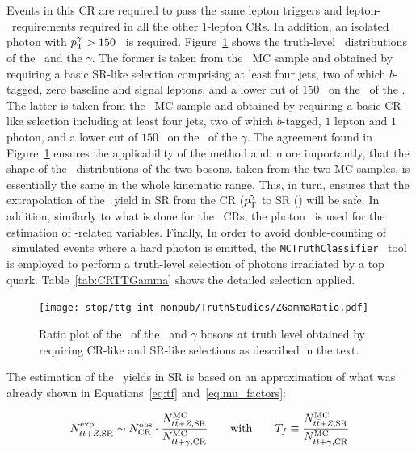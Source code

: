 		Events in this \ac{CR} are required to pass the same lepton triggers and lepton-\pt\ requirements required in all the other $1$-lepton \acp{CR}. In addition, an isolated photon with $p_{\mathrm{T}}^{\gamma} > 150$ \GeV\ is required. Figure~\ref{fig:ZGammaratio} shows the truth-level \pt\ distributions of the \Zboson\ and the $\gamma$. The former is taken from the \ttZ\ \ac{MC} sample and obtained by requiring a basic \ac{SR}-like selection comprising at least four jets, two of which $b$-tagged, zero baseline and signal leptons, and a lower cut of $150$ \GeV\ on the \pt\ of the \Zboson. The latter is taken from the \ttgamma\ \ac{MC} sample and obtained by requiring a basic \ac{CR}-like selection including at least four jets, two of which $b$-tagged, $1$ lepton and $1$ photon, and a lower cut of $150$ \GeV\ on the \pt\ of the $\gamma$. The agreement found in Figure~\ref{fig:ZGammaratio} ensures the applicability of the method and, more importantly, that the shape of the \pt\ distributions of the two bosons. taken from the two \ac{MC} samples, is essentially the same in the whole kinematic range. This, in turn, ensures that the extrapolation of the \ttZ\ yield in \ac{SR} from the CR ($p_{\mathrm{T}}^{\gamma}$ to SR (\met) will be safe. In addition, similarly to what is done for the \Zboson\ \acp{CR}, the photon \pt\ is used for the estimation of \met-related variables. Finally, In order to avoid double-counting of \ttbar\ simulated events where a hard photon is emitted, the \verb+MCTruthClassifier+~\cite{MCTruthClassifier} tool is employed to perform a truth-level selection of photons irradiated by a top quark. Table~\ref{tab:CRTTGamma} shows the detailed selection applied. 

		\begin{figure}[htpb]
		  \centering
		  \texttt{[image: stop/ttg-int-nonpub/TruthStudies/ZGammaRatio.pdf]}
		  \caption{Ratio plot of the \pt\ of the \Zboson\ and $\gamma$ bosons at truth level obtained by requiring \ac{CR}-like and \ac{SR}-like selections as described in the text.}
		  \label{fig:ZGammaratio}
		\end{figure}

		The estimation of the \ttZ\ yields in \ac{SR} is based on an approximation of what was already shown in Equations~\ref{eq:tf} and~\ref{eq:mu_factors}:
		
		\begin{equation}
			N_{t\bar{t}+Z,\mathrm{SR}}^{\mathrm{exp}} \sim N_{\mathrm{CR}}^{\mathrm{obs}} \cdot \frac{N_{t\bar{t}+Z,\mathrm{SR}}^{\mathrm{MC}}}{N_{t\bar{t}+\gamma,\mathrm{CR}}^{\mathrm{MC}}} \qquad \mathrm{with} \qquad T_f \equiv \frac{N_{t\bar{t}+Z,\mathrm{SR}}^{\mathrm{MC}}}{N_{t\bar{t}+\gamma,\mathrm{CR}}^{\mathrm{MC}}}
		\label{eq:ttZ_estimation}
		\end{equation}

